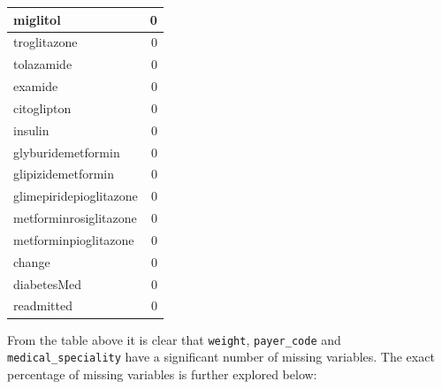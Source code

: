 \documentclass[
]{article}
\begin{document}
\begin{table}[H]
\begin{tabular}[t]{l|r}
\hline
miglitol & 0\\
\hline
troglitazone & 0\\
\hline
tolazamide & 0\\
\hline
examide & 0\\
\hline
citoglipton & 0\\
\hline
insulin & 0\\
\hline
glyburidemetformin & 0\\
\hline
glipizidemetformin & 0\\
\hline
glimepiridepioglitazone & 0\\
\hline
metforminrosiglitazone & 0\\
\hline
metforminpioglitazone & 0\\
\hline
change & 0\\
\hline
diabetesMed & 0\\
\hline
readmitted & 0\\
\hline
\end{tabular}
\end{table}

From the table above it is clear that \texttt{weight},
\texttt{payer\_code} and \texttt{medical\_speciality} have a significant
number of missing variables. The exact percentage of missing variables
is further explored below:
\end{document}
